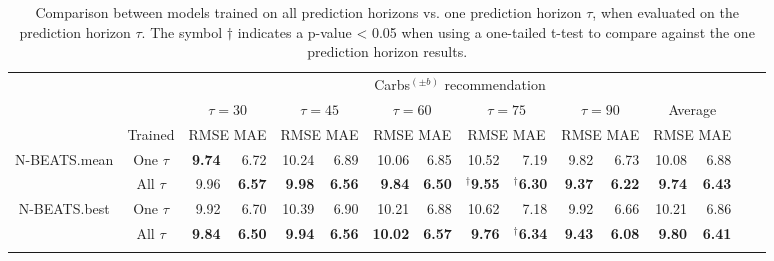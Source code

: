 \begin{table}[ht]
\setlength{\tabcolsep}{1.75pt}
\caption{Comparison between models trained on all prediction horizons vs. one prediction horizon $\tau$, when evaluated on the prediction horizon $\tau$. The symbol $\dagger$ indicates a p-value < 0.05 when using a one-tailed t-test to compare against the one prediction horizon results.}
\begin{center}
\label{tab:transfer_time}
\small
\begin{tabular}{|c|c|rr|rr|rr|rr|rr|rr|rr}
    \cline{3-14}
    \multicolumn{2}{c|}{} & \multicolumn{12}{c|}{Carbs$^{(\pm b)}$ recommendation}\\
    \cline{3-14}
    \multicolumn{2}{c|}{} & \multicolumn{2}{c|}{$\tau=30$} & \multicolumn{2}{c|}{$\tau=45$} & \multicolumn{2}{c|}{$\tau=60$} & \multicolumn{2}{c|}{$\tau=75$} & \multicolumn{2}{c|}{$\tau=90$} & \multicolumn{2}{c|}{Average}\\
    \cline{2-14}
     \multicolumn{1}{c|}{}& Trained & \multicolumn{2}{c|}{\scriptsize RMSE MAE} & \multicolumn{2}{c|}{\scriptsize RMSE MAE} & \multicolumn{2}{c|}{\scriptsize RMSE MAE} & \multicolumn{2}{c|}{\scriptsize RMSE MAE} & \multicolumn{2}{c|}{\scriptsize RMSE MAE} & \multicolumn{2}{c|}{\scriptsize RMSE MAE} \\
    \hline
    \multirow{2}{*}{N-BEATS.mean} & One $\tau$ & {\bf 9.74} & 6.72 & 10.24 & 6.89 & 10.06 & 6.85 & 10.52 & 7.19 & 9.82 & 6.73 & 10.08 & 6.88\\
    & All $\tau$ & 9.96 & {\bf 6.57} & {\bf 9.98} & {\bf 6.56} & {\bf 9.84} & {\bf 6.50} & $^\dagger${\bf 9.55} & $^\dagger${\bf 6.30}& {\bf 9.37} & {\bf 6.22} & {\bf 9.74} & {\bf 6.43}\\
    \hline
    \multirow{2}{*}{N-BEATS.best} & One $\tau$ & 9.92 & 6.70 & 10.39 & 6.90 & 10.21 & 6.88 & 10.62 & 7.18 & 9.92 & 6.66 & 10.21 & 6.86\\
    & All $\tau$ & {\bf 9.84} & {\bf 6.50} & {\bf 9.94} & {\bf 6.56} & {\bf 10.02} & {\bf 6.57} & {\bf 9.76} & $^\dagger${\bf 6.34} & {\bf 9.43} & {\bf 6.08} & {\bf 9.80} & {\bf 6.41}\\
    \hline
    
    \multicolumn{14}{c}{}\\[-1.5ex]


\end{tabular}
\end{center}
\end{table}
